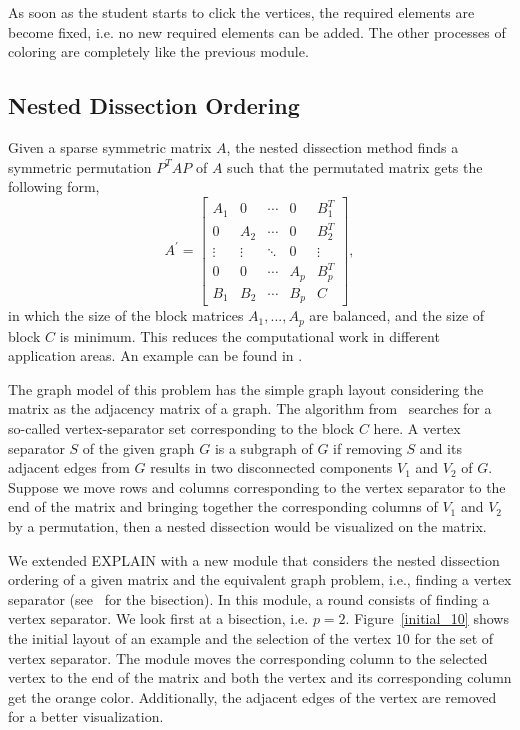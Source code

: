 \documentclass[11pt, twoside,a4paper]{book}
\begin{document}
As soon as the student starts to click the vertices, the required elements
are become fixed, i.e. no new required elements can be added.
The other processes of coloring are completely like the previous module.

\subsection{Nested Dissection Ordering}
Given a sparse symmetric matrix $A$, the nested dissection method finds a 
symmetric permutation $P^T A P$ of $A$ 
such that the permutated matrix gets the following form,
$$
A^{\prime} =
\begin{bmatrix}
A_1 & 0   & \cdots & 0 & B_1^T \\
0   & A_2 & \cdots & 0  & B_2^T \\
\vdots& \vdots & \ddots & 0 & \vdots \\
0   &   0 & \cdots & A_p & B_p^T \\
B_1 & B_2 & \cdots & B_p& C
\end{bmatrix},
$$
in which the size of the block matrices $A_1,...,A_p$ are balanced, 
and the size of block $C$ is minimum.
This reduces the computational work in different application areas.
An example can be found in \cite{2014:02}.

The graph model of this problem has the simple graph layout considering the matrix
as the adjacency matrix of a graph. 
The algorithm from~\cite{2014:02} searches for a so-called vertex-separator set
corresponding to the block $C$ here. A vertex separator $S$ of the given graph $G$ 
is a subgraph of $G$ if removing $S$ and its adjacent edges from $G$ results in two
disconnected components $V_1$ and $V_2$ of $G$. 
Suppose we move rows and columns corresponding to the vertex separator to the end of
the matrix and bringing together 
the corresponding columns of $V_1$ and $V_2$ by a permutation,
then a nested dissection would be visualized on the matrix.

We extended \mbox{EXPLAIN} with
a new module that considers the nested dissection ordering
of a given matrix and the equivalent graph problem, i.e.,
finding a vertex separator (see~\cite{2014:02} for the bisection). 
In this module, a round consists of finding a vertex separator.
We look first at a bisection, i.e. $p=2$. 
Figure~\ref{initial_10} shows the initial layout of an example 
and the selection of the vertex $10$ for the set of vertex separator. The module moves the 
corresponding column to the selected vertex to the end of the matrix
and both the vertex and its corresponding column get the orange color.
Additionally, the adjacent edges of the vertex are removed for a better visualization.
\end{document}
